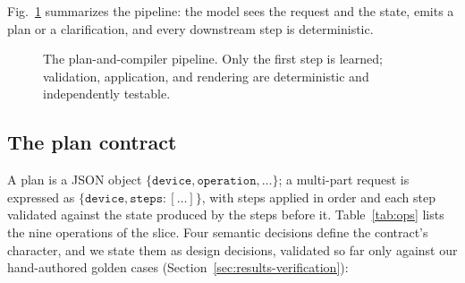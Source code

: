 \documentclass[conference]{IEEEtran}
\begin{document}
Fig.~\ref{fig:arch} summarizes the pipeline: the model sees the request and the state, emits a plan or a clarification, and every downstream step is deterministic.

\begin{figure}[t]
\centering
{}
\caption{The plan-and-compiler pipeline. Only the first step is learned; validation, application, and rendering are deterministic and independently testable.}
\label{fig:arch}
\end{figure}

\subsection{The plan contract}

A plan is a JSON object $\{\texttt{device}, \texttt{operation}, \ldots\}$; a multi-part request is expressed as $\{\texttt{device}, \texttt{steps}: [\ldots]\}$, with steps applied in order and each step validated against the state produced by the steps before it. Table~\ref{tab:ops} lists the nine operations of the slice. Four semantic decisions define the contract's character, and we state them as design decisions, validated so far only against our hand-authored golden cases (Section~\ref{sec:results-verification}):
\end{document}
